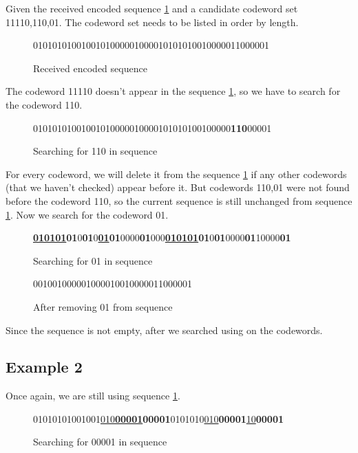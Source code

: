 \documentclass[10pt,letterpaper,notitlepage,draft]{article}
\theoremstyle{definition}
\begin{document}
Given the received encoded sequence \ref{c1} and a candidate codeword set {11110,110,01}. The codeword set needs to be listed in order by length.
\begin{figure}[h!]
\begin{center}
0101010100100101000001000010101010010000011000001
\end{center}
\caption{Received encoded sequence}\label{c1}
\end{figure}

The codeword 11110 doesn't appear in the sequence \ref{c1}, so we have to search for the codeword 110.

\begin{figure}[h!]
\begin{center}
01010101001001010000010000101010100100000{\bf 110}00001
\end{center}
\caption{Searching for 110 in sequence }\label{c2}
\end{figure}

For every codeword, we will delete it from the sequence \ref{c1} if any other codewords (that we haven't checked) appear before it. But codewords {110,01} were not found before the codeword 110, so the current sequence is still unchanged from sequence \ref{c1}. Now we search for the codeword 01. 

\begin{figure}[h!]
\begin{center}
{\bf \underline {010101}01}0{\bf 01}0{\bf\underline{01}01}0000{\bf 01}000{\bf\underline{010101}01}0{\bf 01}0000{\bf 01}10000{\bf 01}
\end{center}
\caption{Searching for 01 in sequence }\label{c3}
\end{figure}

\begin{figure}[h!]
\begin{center}
001001000001000010010000011000001
\end{center}
\caption{After removing 01 from sequence}\label{c3}
\end{figure}

Since the sequence is not empty, after we searched using on the codewords.

\subsection{Example 2}

Once again, we are still using sequence \ref{c1}. 

\begin{figure}[h!]
\begin{center}
01010101001001\underline{010}{\bf\underline{00001}}{\bf00001}0101010\underline{010}{\bf00001}\underline{10}{\bf00001}
\end{center}
\caption{Searching for 00001 in sequence}\label{c4}
\end{figure}
\end{document}

